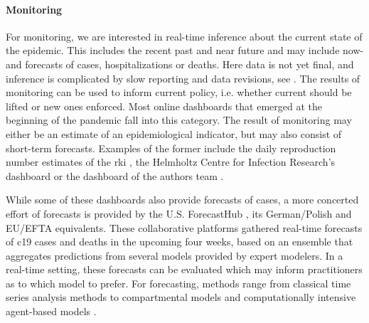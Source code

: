 \paragraph{Monitoring}
For monitoring, we are interested in real-time inference about the current state of the epidemic. This includes the recent past and near future and may include now- and forecasts of cases, hospitalizations or deaths. Here data is not yet final, and inference is complicated by slow reporting and data revisions, see . The results of monitoring can be used to inform current policy, i.e. whether current  should be lifted or new ones enforced. Most online dashboards that emerged at the beginning of the pandemic fall into this category. The result of monitoring may either be an estimate of an epidemiological indicator, but may also consist of short-term forecasts. Examples of the former include the daily reproduction number estimates of the \acrshort{rki} \citep{AnDerHeiden2020Schatzung}, the Helmholtz Centre for Infection Research's dashboard \citep{Khailaie2021Development} or the dashboard of the authors team \citep{Hotz2020Monitoring}.

While some of these dashboards also provide forecasts of cases, a more concerted effort of forecasts is provided by the U.S. ForecastHub \citep{Ray2020Ensemble}, its German/Polish \citep{Bracher2021Preregistered,Bracher2022National} and EU/EFTA \citep{Sherratt2022Predictive} equivalents. These collaborative platforms gathered real-time forecasts of \acrshort{c19} cases and deaths in the upcoming four weeks, based on an ensemble that aggregates predictions from several models provided by expert modelers. In a real-time setting, these forecasts can be evaluated which may inform practitioners as to which model to prefer. 
For forecasting, methods range from classical time series analysis methods \citep{Arroyo-Marioli2021Tracking} to compartmental models \citep{Khailaie2021Development} and computationally intensive agent-based models \citep{Adamik2020Mitigation}.

